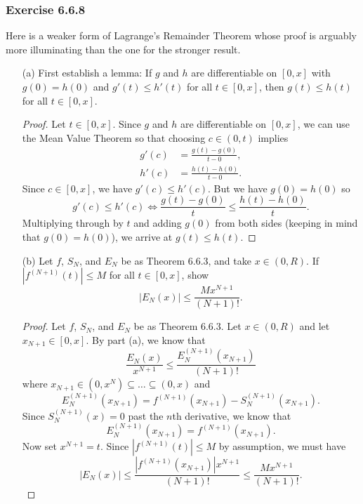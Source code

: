 \subsubsection{Exercise 6.6.8} Here is a weaker form of Lagrange's Remainder Theorem whose proof is arguably more illuminating than the one for the stronger result.
\begin{enumerate}
    \item[(a)] First establish a lemma: If \( g  \) and \( h  \) are differentiable on \( [0,x] \) with \( g(0) = h(0)  \) and \( g'(t) \leq h'(t) \) for all \( t \in [0,x] \), then \( g(t) \leq h(t)  \) for all \( t \in [0,x]  \).
        \begin{proof}
            Let \( t \in [0,x] \). Since \( g \) and \( h  \) are differentiable on \( [0,x] \), we can use the Mean Value Theorem so that choosing \( c \in (0,t) \) implies 
            \begin{align*}
                g'(c)  &= \frac{ g(t) - g(0) }{ t - 0  },   \\
                h'(c) &= \frac{ h(t) - h(0)  }{ t - 0 }.
            \end{align*}
            Since \( c \in [0,x]  \), we have \( g'(c) \leq h'(c)  \). But we have \( g(0) = h(0) \) so 
            \[  g'(c) \leq h'(c) \iff \frac{ g(t) - g(0)  }{ t  } \leq \frac{ h(t) - h(0)  }{ t  } . \]
            Multiplying through by \( t  \) and adding \( g(0)  \) from both sides (keeping in mind that \( g(0) = h(0) \)), we arrive at \( g(t) \leq h(t) \).
        \end{proof}
    \item[(b)] Let \( f  \), \( S_N  \), and \( E_N  \) be as Theorem 6.6.3, and take \( x \in (0,R ) \). If \( | f^{(N+1)}(t) | \leq M  \) for all \( t \in [0,x ] \), show 
        \[  | E_{N}(x) | \leq \frac{ M x^{N+1} }{ (N+1)! }. \]
        \begin{proof}
            Let \( f  \), \( S_{N} \), and \( E_{N} \) be as Theorem 6.6.3. Let \( x \in (0,R ) \) and let \( x_{N+1} \in [0,x] \). By part (a), we know that 
        \[  \frac{ E_N(x) }{ x^{N+1} } \leq \frac{ E_{N}^{(N+1)}(x_{N+1}) }{ (N+1)! }  \]
        where \( x_{N+1} \in (0, x^{N}) \subseteq \dots \subseteq (0,x)  \) and 
        \[  E_{N}^{(N+1)}(x_{N+1}) = f^{(N+1)}(x_{N+1}) - S_{N}^{(N+1)}(x_{N+1}). \]
        Since \( S_{N}^{(N+1)}(x) = 0  \) past the \( n \)th derivative, we know that 
        \[  E_{N}^{(N+1)}(x_{N+1}) = f^{(N+1)}(x_{N+1}). \] Now set \( x^{N+1} = t  \). Since \( | f^{(N+1)}(t) | \leq M  \) by assumption, we must have
        \[  | E_N(x)  | \leq \frac{ | f^{(N+1)}(x_{N+1}) | x^{N+1} }{ (N+1)! }  \leq \frac{ M x^{N+1} }{ (N+1)! }.\]
        \end{proof}
\end{enumerate}

